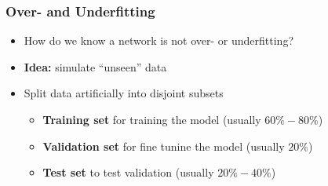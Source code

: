 \documentclass[aspectratio=1610]{beamer}
\begin{document}
\begin{frame}
\frametitle{Over- and Underfitting}

\begin{itemize}
    \item How do we know a network is not over- or underfitting?
    \item \textbf{Idea:} simulate ``unseen'' data
    \item Split data artificially into disjoint subsets
    \begin{itemize}
        \item \textbf{Training set} for training the model (usually $60\%-80\%$)
        \item \textbf{Validation set} for fine tunine the model (usually $20\%$)
        \item \textbf{Test set} to test validation (usually $20\%-40\%$)
    \end{itemize}
\end{itemize}
\end{frame}
\end{document}
